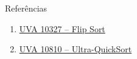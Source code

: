 \begin{frame}[fragile]{Referências}

    \begin{enumerate}
        \item \href{https://uva.onlinejudge.org/index.php?option=com_onlinejudge&Itemid=8&category=15&page=show_problem&problem=1268}{UVA 10327 -- Flip Sort}

        \item \href{https://uva.onlinejudge.org/index.php?option=com_onlinejudge&Itemid=8&page=show_problem&problem=1751}{UVA 10810 -- Ultra-QuickSort}

    \end{enumerate}

\end{frame}
